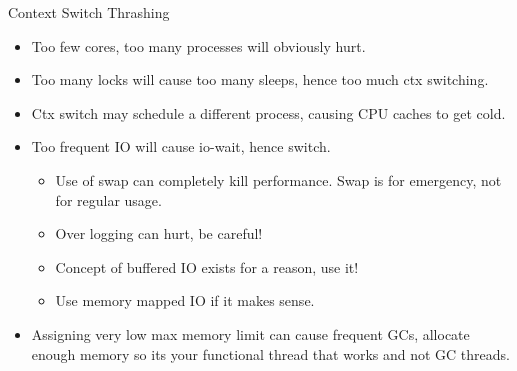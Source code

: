 \documentclass{beamer}
\begin{document}
\begin{frame}{Context Switch Thrashing}
  \begin{itemize}
  \item Too few cores, too many processes will obviously hurt.
    \pause
  \item Too many locks will cause too many sleeps, hence too much ctx switching.
    \pause
  \item Ctx switch may schedule a different process, causing CPU caches to get cold.
    \pause
  \item Too frequent IO will cause io-wait, hence switch.
    \begin{itemize}
    \item Use of swap can completely kill performance. Swap is for emergency, not for regular usage.
    \item Over logging can hurt, be careful!
    \item Concept of buffered IO exists for a reason, use it!
    \item Use memory mapped IO if it makes sense.
    \end{itemize}
    \pause
  \item Assigning very low max memory limit can cause frequent GCs, allocate enough memory so its your functional thread that works and not GC threads.
  \end{itemize}
\end{frame}



\end{document}
